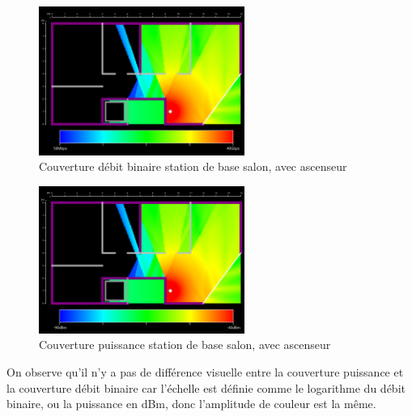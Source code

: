 \begin{figure}[H]
    \centering
    \includegraphics[width=0.6\textwidth]{latex/images/highres-with-lift.png}
    \caption{Couverture débit binaire station de base salon, avec ascenseur}
    \label{fig:simu-emplacement-defaut-avecasc}
\end{figure}

\begin{figure}[H]
    \centering
    \includegraphics[width=0.6\textwidth]{latex/images/highres-with-lift-power.png}
    \caption{Couverture puissance station de base salon, avec ascenseur}
    \label{fig:simu-emplacement-defaut-avecasc-puissance}
\end{figure}

On observe qu'il n'y a pas de différence visuelle entre la couverture puissance et la couverture débit binaire
car l'échelle est définie comme le logarithme du débit binaire, ou la puissance en dBm, donc l'amplitude de couleur est la même.





